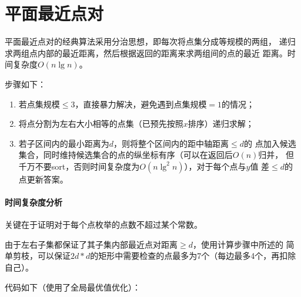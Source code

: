 \section{平面最近点对}
平面最近点对的经典算法采用分治思想，即每次将点集分成等规模的两组，
递归求两组点内部的最近距离，然后根据返回的距离来求两组间的点的最近
距离。时间复杂度$O(n\lg n)$。

步骤如下：
\begin{enumerate}
    \item 若点集规模$\leq 3$，直接暴力解决，避免遇到点集规模$=1$的情况；
    \item 将点分割为左右大小相等的点集（已预先按照$x$排序）递归求解；
    \item 若子区间内的最小距离为$d$，则将整个区间内的距中轴距离$\leq d$的
    点加入候选集合，同时维持候选集合的点的纵坐标有序（可以在返回后$O(n)$归并，
    但千万不要sort，否则时间复杂度为$O(n\lg^2 n)$），对于每个点与$y$值
    差$\leq d$的点更新答案。
\end{enumerate}

\paragraph{时间复杂度分析}
关键在于证明对于每个点枚举的点数不超过某个常数。

由于左右子集都保证了其子集内部最近点对距离$\geq d$，使用计算步骤中所述的
简单剪枝，可以保证$2d*d$的矩形中需要检查的点最多为7个（每边最多4个，再扣除自己）。

代码如下（使用了全局最优值优化）：

